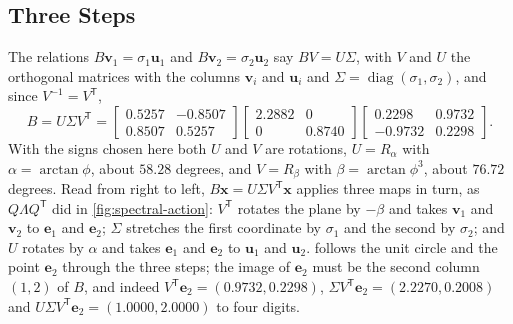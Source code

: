 \subsection{Three Steps}

The relations $B\mathbf v_1=\sigma_1\mathbf u_1$ and $B\mathbf v_2=\sigma_2\mathbf u_2$ say $BV=U\Sigma$, with $V$ and $U$ the orthogonal matrices with the columns $\mathbf v_i$ and $\mathbf u_i$ and $\Sigma=\operatorname{diag}(\sigma_1,\sigma_2)$, and since $V^{-1}=V^{\mathsf T}$,
\[
B=U\Sigma V^{\mathsf T}=\begin{bmatrix}0.5257&-0.8507\\0.8507&0.5257\end{bmatrix}\begin{bmatrix}2.2882&0\\0&0.8740\end{bmatrix}\begin{bmatrix}0.2298&0.9732\\-0.9732&0.2298\end{bmatrix}.
\]
With the signs chosen here both $U$ and $V$ are rotations, $U=R_\alpha$ with $\alpha=\arctan\phi$, about $58.28$ degrees, and $V=R_\beta$ with $\beta=\arctan\phi^3$, about $76.72$ degrees. Read from right to left, $B\mathbf x=U\Sigma V^{\mathsf T}\mathbf x$ applies three maps in turn, as $Q\Lambda Q^{\mathsf T}$ did in \cref{fig:spectral-action}: $V^{\mathsf T}$ rotates the plane by $-\beta$ and takes $\mathbf v_1$ and $\mathbf v_2$ to $\mathbf e_1$ and $\mathbf e_2$; $\Sigma$ stretches the first coordinate by $\sigma_1$ and the second by $\sigma_2$; and $U$ rotates by $\alpha$ and takes $\mathbf e_1$ and $\mathbf e_2$ to $\mathbf u_1$ and $\mathbf u_2$.  follows the unit circle and the point $\mathbf e_2$ through the three steps; the image of $\mathbf e_2$ must be the second column $(1,2)$ of $B$, and indeed $V^{\mathsf T}\mathbf e_2=(0.9732,0.2298)$, $\Sigma V^{\mathsf T}\mathbf e_2=(2.2270,0.2008)$ and $U\Sigma V^{\mathsf T}\mathbf e_2=(1.0000,2.0000)$ to four digits.


